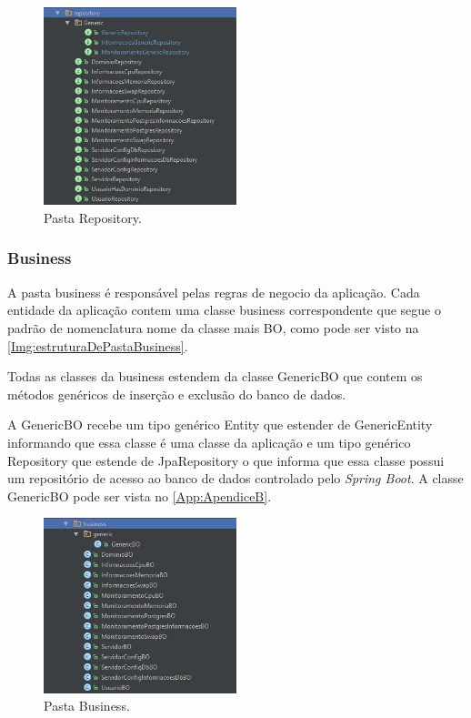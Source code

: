 \begin{figure}[H]
	\centering
	\includegraphics[width=0.5\textwidth]{figuras/estruturaPojetoRepository.JPG}
	\caption[Pasta Repository.]{Pasta Repository.}
	\label{Img:estruturaDePastaRepository}
\end{figure}


\subsubsection{Business}\label{subsubsec:business}

A pasta business é responsável pelas regras de negocio da aplicação. Cada entidade da aplicação contem uma classe business correspondente que segue o padrão de nomenclatura nome da classe mais BO, como pode ser visto na \autoref{Img:estruturaDePastaBusiness}. 

Todas as classes da business estendem da classe GenericBO que contem os métodos genéricos de inserção e exclusão do banco de dados. 

A GenericBO recebe um tipo genérico Entity que estender de GenericEntity informando que essa classe é uma classe da aplicação e um tipo genérico Repository que estende de JpaRepository o que informa que essa classe possui um repositório de acesso ao banco de dados controlado pelo \textit{Spring Boot}. A classe GenericBO pode ser vista no \autoref{App:ApendiceB}.

\begin{figure}[H]
	\centering
	\includegraphics[width=0.5\textwidth]{figuras/estruturaPojetoBusines.JPG}
	\caption[Pasta Business.]{Pasta Business.}
	\label{Img:estruturaDePastaBusiness}
\end{figure}



